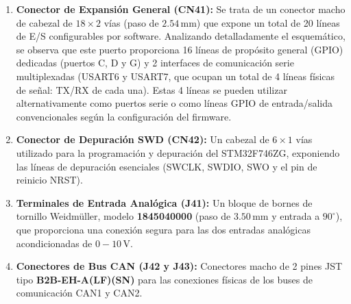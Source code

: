 \documentclass[12pt,a4paper]{article}
\begin{document}
\begin{enumerate}
    \item \textbf{Conector de Expansión General (CN41):} Se trata de un conector macho de cabezal de $18\times2$ vías (paso de $2.54\,\text{mm}$) que expone un total de 20 líneas de E/S configurables por software. Analizando detalladamente el esquemático, se observa que este puerto proporciona 16 líneas de propósito general (GPIO) dedicadas (puertos C, D y G) y 2 interfaces de comunicación serie multiplexadas (USART6 y USART7, que ocupan un total de 4 líneas físicas de señal: TX/RX de cada una). Estas 4 líneas se pueden utilizar alternativamente como puertos serie o como líneas GPIO de entrada/salida convencionales según la configuración del firmware.
    \item \textbf{Conector de Depuración SWD (CN42):} Un cabezal de $6\times1$ vías utilizado para la programación y depuración del STM32F746ZG, exponiendo las líneas de depuración esenciales (SWCLK, SWDIO, SWO y el pin de reinicio NRST).
    \item \textbf{Terminales de Entrada Analógica (J41):} Un bloque de bornes de tornillo Weidmüller, modelo \textbf{1845040000} (paso de $3.50\,\text{mm}$ y entrada a $90^\circ$), que proporciona una conexión segura para las dos entradas analógicas acondicionadas de $0-10\,\text{V}$.
    \item \textbf{Conectores de Bus CAN (J42 y J43):} Conectores macho de 2 pines JST tipo \textbf{B2B-EH-A(LF)(SN)} para las conexiones físicas de los buses de comunicación CAN1 y CAN2.
\end{enumerate}
\end{document}
